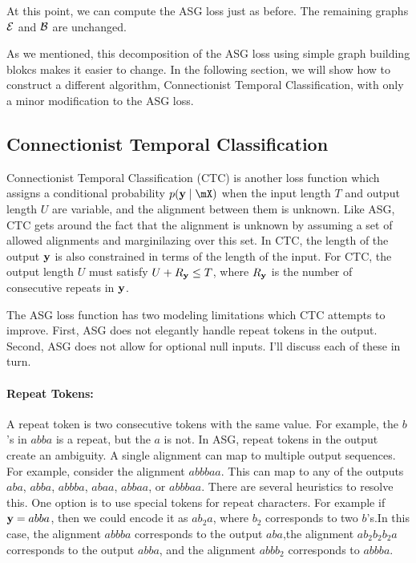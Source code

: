 At this point, we can compute the ASG loss just as before. The remaining graphs
$\mathcal{E}$ and $\mathcal{B}$ are unchanged.

As we mentioned, this decomposition of the ASG loss using simple graph building
blokcs makes it easier to change. In the following section, we will show how to
construct a different algorithm, Connectionist Temporal Classification, with
only a minor modification to the ASG loss.

\subsection{Connectionist Temporal Classification}

Connectionist Temporal Classification (CTC) is another loss function which
assigns a conditional probability $p(\vy \mid \mX)$ when the input length $T$
and output length $U$ are variable, and the alignment between them is unknown.
Like ASG, CTC gets around the fact that the alignment is unknown by assuming a
set of allowed alignments and marginilazing over this set. In CTC, the length
of the output ${\bf y}$ is also constrained in terms of the length of the input.
For CTC, the output length $U$ must satisfy $U + R_{\bf y} \le T$, where $R_{\bf y}$ is
the number of consecutive repeats in ${\bf y}$.

The ASG loss function has two modeling limitations which CTC attempts to
improve. First, ASG does not elegantly handle repeat tokens in the output.
Second, ASG does not allow for optional null inputs. I'll discuss each of these
in turn.

\paragraph{Repeat Tokens:} A repeat token is two consecutive tokens with the
same value. For example, the $b$'s in $abba$ is a repeat, but the $a$ is not.
In ASG, repeat tokens in the output create an ambiguity. A single alignment can
map to multiple output sequences. For example, consider the alignment $abbbaa$.
This can map to any of the outputs $aba$, $abba$, $abbba$, $abaa$, $abbaa$, or
$abbbaa$. There are several heuristics to resolve this. One option is to use
special tokens for repeat characters. For example if ${\bf y} = abba$, then we
could encode it as $ab_2a$, where $b_2$ corresponds to two $b$'s.In this case,
the alignment $abbba$ corresponds to the output $aba$,the alignment
$ab_2b_2b_2a$ corresponds to the output $abba$, and the alignment $abbb_2$
corresponds to $abbba$.

